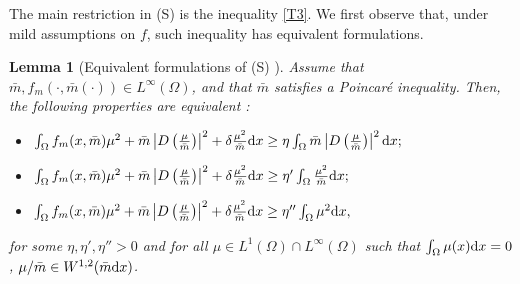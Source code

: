 \documentclass[10pt,a4paper,nouppercase,nowrite]{article}
\numberwithin{equation}{section}
\newcommand{\di}{{\rm d}}
\newcommand{\Sp}{{\textsc (S)} }
\newtheorem{lem}[defn]{Lemma}
\theoremstyle{definition}
\begin{document}
\smallskip

The main restriction in \Sp is the inequality \eqref{T3}. We first observe that, under mild assumptions on $f$, such inequality has equivalent formulations. 

\begin{lem}[Equivalent formulations of \Sp]\label{abc}
	Assume that $\bar m, f_m (\cdot,\bar{m}(\cdot)) \in L^\infty(\Omega)$, and that $\bar m$ satisfies a Poincar\'e inequality. Then, the following properties are equivalent :
	\begin{itemize}
		\item [(a)] $\int_{\Omega} f_m (x,\bar{m}) \mu^2 + \bar{m} \left| D\left( \frac{\mu}{\bar{m}} \right) \right|^2 + \delta \frac{\mu^2}{\bar{m}} \di x \geq \eta \int_{\Omega} \bar{m} \left| D\left( \frac{\mu}{\bar{m}} \right) \right|^2 \di x;$
		\item [(b)] $\int_{\Omega} f_m(x,\bar{m}) \mu^2 + \bar{m} \left| D\left( \frac{\mu}{\bar{m}} \right) \right|^2 + \delta \frac{\mu^2}{\bar{m}} \di x \geq \eta' \int_{\Omega} \frac{\mu^2}{\bar{m}} \di x;$
		\item [(c)] $\int_{\Omega} f_m(x,\bar{m}) \mu^2 + \bar{m} \left| D\left( \frac{\mu}{\bar{m}} \right) \right|^2 + \delta \frac{\mu^2}{\bar{m}} \di x \geq \eta'' \int_{\Omega} \mu^2 \di x,$
	\end{itemize}
	for some $\eta, \eta', \eta'' > 0$ and for all $\mu \in L^1(\Omega) \cap L^\infty(\Omega)$ such that $\int_{\Omega} \mu(x) \di x = 0$, $\mu/\bar m \in  W^{1,2}(\bar m \di x)$.
\end{lem}
\end{document}
